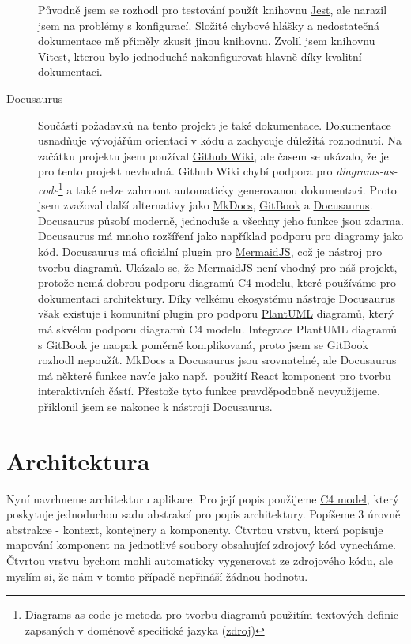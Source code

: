 \begin{description}
    Původně jsem se rozhodl pro testování použít knihovnu \href{https://jestjs.io/}{Jest}, ale narazil jsem na problémy s konfigurací.
    Složité chybové hlášky a nedostatečná dokumentace mě přiměly zkusit jinou knihovnu.
    Zvolil jsem knihovnu Vitest, kterou bylo jednoduché nakonfigurovat hlavně díky kvalitní dokumentaci.
    \item[\href{https://docusaurus.io/}{Docusaurus}]
    Součástí požadavků na tento projekt je také dokumentace.
    Dokumentace usnadňuje vývojářům orientaci v kódu a zachycuje důležitá rozhodnutí.
    Na začátku projektu jsem používal \href{https://docs.github.com/en/communities/documenting-your-project-with-wikis/about-wikis}{Github Wiki}, ale časem se ukázalo, že je pro tento projekt nevhodná.
    Github Wiki chybí podpora pro \textit{diagrams-as-code}\footnote{Diagrams-as-code je metoda pro tvorbu diagramů použitím textových definic zapsaných v doménově specifické jazyka (\href{https://docs.eraser.io/docs/diagram-as-code}{zdroj})} a také nelze zahrnout automaticky generovanou dokumentaci.
    Proto jsem zvažoval další alternativy jako \href{https://www.mkdocs.org/}{MkDocs}, \href{https://www.gitbook.com/}{GitBook} a \href{https://docusaurus.io/}{Docusaurus}.
    Docusaurus působí moderně, jednoduše a všechny jeho funkce jsou zdarma.
    Docusaurus má mnoho rozšíření jako například podporu pro diagramy jako kód.
    Docusaurus má oficiální plugin pro \href{https://mermaid.js.org/}{MermaidJS}, což je nástroj pro tvorbu diagramů.
    Ukázalo se, že MermaidJS není vhodný pro náš projekt, protože nemá dobrou podporu \href{https://c4model.com/}{diagramů C4 modelu}, které používáme pro dokumentaci architektury.
    Díky velkému ekosystému nástroje Docusaurus však existuje i komunitní plugin pro podporu \href{https://plantuml.com/}{PlantUML} diagramů, který má skvělou podporu diagramů C4 modelu.
    Integrace PlantUML diagramů s GitBook je naopak poměrně komplikovaná, proto jsem se GitBook rozhodl nepoužít.
    MkDocs a Docusaurus jsou srovnatelné, ale Docusaurus má některé funkce navíc jako např.\ použití React komponent pro tvorbu interaktivních částí.
    Přestože tyto funkce pravděpodobně nevyužijeme, přiklonil jsem se nakonec k nástroji Docusaurus.
\end{description}

\section{Architektura}\label{sec:architektura}

Nyní navrhneme architekturu aplikace.
Pro její popis použijeme \href{https://c4model.com/}{C4 model}, který poskytuje jednoduchou sadu abstrakcí pro popis architektury.
Popíšeme 3 úrovně abstrakce - kontext, kontejnery a komponenty.
Čtvrtou vrstvu, která popisuje mapování komponent na jednotlivé soubory obsahující zdrojový kód vynecháme.
Čtvrtou vrstvu bychom mohli automaticky vygenerovat ze zdrojového kódu, ale myslím si, že nám v tomto případě nepřináší žádnou hodnotu.

